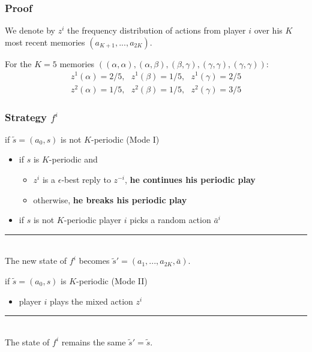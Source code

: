 \documentclass{beamer}
\begin{document}
\begin{frame}
    \frametitle{Proof}
    \begin{definition}
        We denote by $z^i$ the frequency distribution of actions from player $i$
        over his $K$ most recent memories $(a_{K+1}, ..., a_{2K})$.
    \end{definition}
    \pause
    \begin{example}
        For the $K=5$ memories %
			$((\alpha, \alpha), (\alpha, \beta), (\beta, \gamma), (\gamma, \gamma), (\gamma, \gamma))$:
        \begin{gather*}
            z^1(\alpha) = 2/5, \,\,\,\, z^1(\beta) = 1/5, \,\,\,\, z^1(\gamma) = 2/5\\
            z^2(\alpha) = 1/5, \,\,\,\, z^2(\beta) = 1/5, \,\,\,\, z^2(\gamma) = 3/5
        \end{gather*}
    \end{example}
\end{frame}

\begin{frame}
    \frametitle{Strategy $f^i$}
    \pause
    \begin{exampleblock}{if $\tilde{s} = (a_0, s)$ is not $K$-periodic (Mode I)}
        \pause
        \begin{itemize}
            \item<3-> if $s$ is $K$-periodic and
                
                \begin{itemize}
                    \item<4-> $z^i$ is a $\epsilon$-best reply to $z^{-i}$,
                    \textbf<4>{he continues his periodic play}
			
			        \item<5-> otherwise, \textbf<5>{he breaks his periodic play}
                \end{itemize}
			
			\item<6-> if $s$ is not $K$-periodic player $i$ picks a random action $\bar{a}^i$
        \end{itemize}
        \vspace{-5pt}
        \textcolor{eth}{\noindent\rule{\textwidth}{0.7pt}}\\
        The new state of $f^i$ becomes $\tilde{s}' = (a_1, ..., a_{2K}, \bar{a})$.
    \end{exampleblock}
    \begin{exampleblock}{if $\tilde{s} = (a_0, s)$ is $K$-periodic (Mode II)}
        \begin{itemize}
			\item player $i$ plays the mixed action $z^i$
        \end{itemize}
        \vspace{-5pt}
        \textcolor{eth}{\noindent\rule{\textwidth}{0.7pt}}\\
        The state of $f^i$ remains the same $\tilde{s}' = \tilde{s}$.
    \end{exampleblock}
\end{frame}
\end{document}
